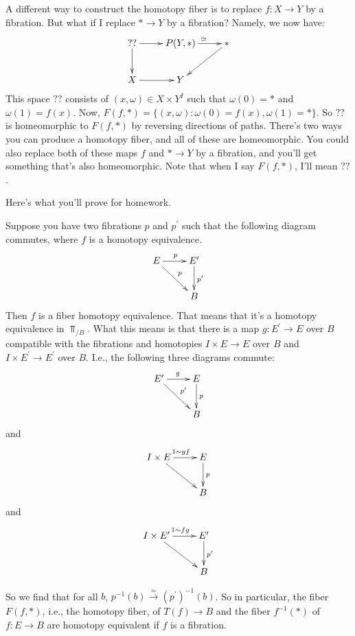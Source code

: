 A different way to construct the homotopy fiber is to replace $f:X\to Y$ by a fibration. But what if I replace $\ast\to Y$ by a fibration? Namely, we now have:
\begin{equation*}
    \xymatrix{
	??\ar[r]\ar[d] & P(Y,\ast)\ar[r]^{\simeq} & \ast\ar[dl]\\
	X\ar[r] & Y & 
    }
\end{equation*}
This space $??$ consists of $(x,\omega)\in X\times Y^I$ such that $\omega(0) = \ast$ and $\omega(1) = f(x)$. Now, $F(f,\ast) = \{(x,\omega):\omega(0) = f(x), \omega(1) = \ast\}$. So $??$ is homeomorphic to $F(f,\ast)$ by reversing directions of paths. There's two ways you can produce a homotopy fiber, and all of these are homeomorphic. You could also replace both of these maps $f$ and $\ast\to Y$ by a fibration, and you'll get something that's also homeomorphic. Note that when I say $F(f,\ast)$, I'll mean $??$.

Here's what you'll prove for homework.
\begin{theorem}
    Suppose you have two fibrations $p$ and $p^\prime$ such that the following diagram commutes, where $f$ is a homotopy equivalence.
    \begin{equation*}
	\xymatrix{
	    E\ar[r]^p\ar[dr]^p & E^\prime\ar[d]^{p^\prime}\\
	    & B
	    }
    \end{equation*}
    Then $f$ is a fiber homotopy equivalence. That means that it's a homotopy equivalence in $\Top_{/B}$. What this means is that there is a map $g:E^\prime\to E$ over $B$ compatible with the fibrations and homotopies $I\times E\to E$ over $B$ and $I\times E^\prime\to E^\prime$ over $B$. I.e., the following three diagrams commute:
    \begin{equation*}
	\xymatrix{
	    E^\prime\ar[r]^g\ar[dr]^{p^\prime} & E\ar[d]^p\\
	    & B
	    }
    \end{equation*}
    and 
    \begin{equation*}
	\xymatrix{
	    I\times E\ar[r]^{1\sim gf}\ar[dr] & E\ar[d]^p\\
	    & B
	    }
    \end{equation*}
    and
    \begin{equation*}
	\xymatrix{
	    I\times E^\prime\ar[r]^{1\sim fg}\ar[dr] & E^\prime\ar[d]^{p^\prime}\\
	    & B
	    }
    \end{equation*}
\end{theorem}
So we find that for all $b$, $p^{-1}(b)\xrightarrow{\simeq} (p^\prime)^{-1}(b)$. So in particular, the fiber $F(f,\ast)$, i.e., the homotopy fiber, of $T(f)\to B$ and the fiber $f^{-1}(\ast)$ of $f:E\to B$ are homotopy equivalent if $f$ is a fibration.
